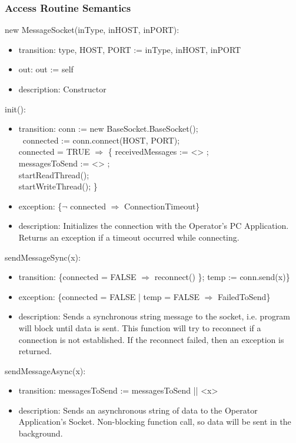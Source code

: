 \documentclass[12pt, titlepage]{article}
\begin{document}
\subsubsection{Access Routine Semantics}
\noindent new MessageSocket(inType, inHOST, inPORT):
\begin{itemize}
\item transition: type, HOST, PORT := inType, inHOST, inPORT
\item out:  out := self
\item description: Constructor
\end{itemize}
\noindent init():
\begin{itemize}
\item transition: conn := new BaseSocket.BaseSocket(); \\ \ connected := conn.connect(HOST, PORT); \\ connected = TRUE $\Rightarrow$ \{  receivedMessages := <> ; \\ messagesToSend := <> ;\\ startReadThread(); \\ startWriteThread(); \}
\item exception:  \{$\neg$ connected  $\Rightarrow$ ConnectionTimeout\}
\item description: Initializes the connection with the Operator's PC Application. Returns an exception if a timeout occurred while connecting.
\end{itemize}
\noindent sendMessageSync(x):
\begin{itemize}
\item transition: \{connected = FALSE $\Rightarrow$ reconnect() \}; temp := conn.send(x)\}
\item exception: \{connected = FALSE | temp = FALSE $\Rightarrow$ FailedToSend\}
\item description: Sends a synchronous string message to the socket, i.e. program will block until data is sent. This function will try to reconnect if a connection is not established. If the reconnect failed, then an exception is returned.
\end{itemize}
\noindent sendMessageAsync(x):
\begin{itemize}
\item transition: messagesToSend := messagesToSend || <x>
\item description: Sends an asynchronous string of data to the Operator Application's Socket. Non-blocking function call, so data will be sent in the background.
\end{itemize}
\end{document}
